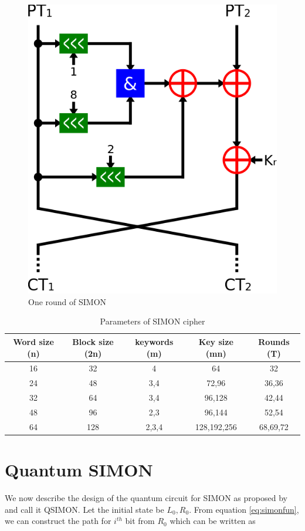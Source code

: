 \documentclass[preprint]{transcrypto}
\begin{document}
\begin{figure}[h!]
    \centering
    \includegraphics[width=0.5\linewidth]{simon/simon.png}
    \caption{One round of SIMON \cite{wiki:simon}}
    \label{fig:ors}
\end{figure}

\begin{center}
\begin{table}[h!]
    \centering
    \begin{tabular}{ |c|c|c|c|c| } 
     \hline
     Word size (n) & Block size (2n)  & keywords (m) & Key size (mn) & Rounds (T) \\ \hline
     16 & 32 & 4 & 64 & 32  \\ \hline 
     24 & 48 & 3,4 & 72,96 & 36,36 \\ \hline
     32 & 64 & 3,4 & 96,128 & 42,44 \\ \hline
     48 & 96 & 2,3 & 96,144 & 52,54  \\ \hline
     64 & 128 & 2,3,4 & 128,192,256 & 68,69,72  \\ \hline
     
    \end{tabular}
    \caption{Parameters of SIMON cipher \cite{gos}}
    \label{tab:sp}
\end{table}
\end{center}



\section{Quantum SIMON}\label{sec:qsimon}
We now describe the design of the quantum circuit for SIMON as proposed by \cite{gos} and call it QSIMON. Let the initial state be $L_0, R_0$. From equation \ref{eq:simonfun}, we can construct the path for $i^{th}$ bit from $R_0$ which can be written as
\end{document}
